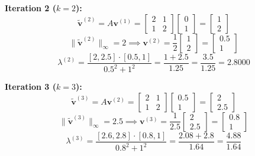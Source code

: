 \documentclass{article}
\newcommand{\0}{{\mathbf{0}}} %
\begin{document}
\textbf{Iteration 2 ($k=2$):}
\[
\tilde{\mathbf{v}}^{(2)} = A \mathbf{v}^{(1)} =
\begin{bmatrix} 2 & 1 \\ 1 & 2
\end{bmatrix}
\begin{bmatrix} 0 \\ 1
\end{bmatrix} =
\begin{bmatrix} 1 \\ 2
\end{bmatrix}
\]
\[
\|\tilde{\mathbf{v}}^{(2)}\|_\infty = 2 \implies \mathbf{v}^{(2)} = \frac{1}{2}
\begin{bmatrix} 1 \\ 2
\end{bmatrix} =
\begin{bmatrix} 0.5 \\ 1
\end{bmatrix}
\]
\[
\lambda^{(2)} = \frac{[2, 2.5] \cdot [0.5, 1]}{0.5^2 + 1^2} = \frac{1 + 2.5}{1.25} = \frac{3.5}{1.25} = \mathbf{2.8000}
\]

\textbf{Iteration 3 ($k=3$):}
\[
\tilde{\mathbf{v}}^{(3)} = A \mathbf{v}^{(2)} =
\begin{bmatrix} 2 & 1 \\ 1 & 2
\end{bmatrix}
\begin{bmatrix} 0.5 \\ 1
\end{bmatrix} =
\begin{bmatrix} 2 \\ 2.5
\end{bmatrix}
\]
\[
\|\tilde{\mathbf{v}}^{(3)}\|_\infty = 2.5 \implies \mathbf{v}^{(3)} = \frac{1}{2.5}
\begin{bmatrix} 2 \\ 2.5
\end{bmatrix} =
\begin{bmatrix} 0.8 \\ 1
\end{bmatrix}
\]
\[
\lambda^{(3)} = \frac{[2.6, 2.8] \cdot [0.8, 1]}{0.8^2 + 1^2} = \frac{2.08 + 2.8}{1.64} = \frac{4.88}{1.64}
\]
\end{document}
